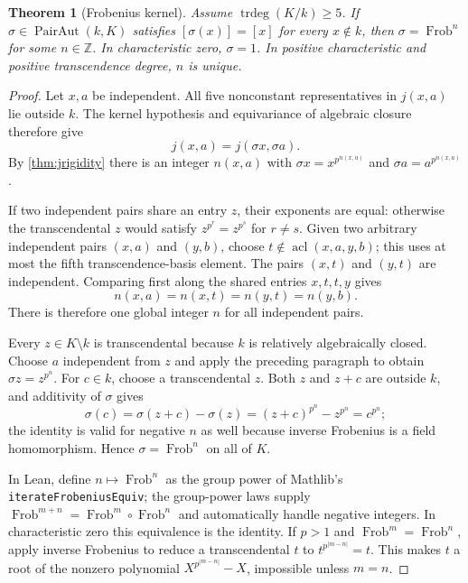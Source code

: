 \documentclass[11pt,oneside]{article}
\newtheorem{theorem}{Theorem}[section]
\theoremstyle{definition}
\theoremstyle{remark}
\newcommand{\acl}{\operatorname{acl}}
\newcommand{\trdeg}{\operatorname{trdeg}}
\newcommand{\Frob}{\operatorname{Frob}}
\newcommand{\lean}[1]{\nolinkurl{#1}}
\begin{document}
\begin{theorem}[Frobenius kernel]\label{thm:kernel}
Assume $\trdeg(K/k)\geq5$. If $\sigma\in\operatorname{PairAut}(k,K)$ satisfies
$[\sigma(x)]=[x]$ for every $x\notin k$, then
$\sigma=\Frob^n$ for some $n\in\mathbb Z$.  In characteristic zero, $\sigma=1$.
In positive characteristic and positive transcendence degree, $n$ is unique.
\end{theorem}
\begin{proof}
Let $x,a$ be independent.  All five nonconstant representatives in $j(x,a)$ lie outside
$k$.  The kernel hypothesis and equivariance of algebraic closure therefore give
\[
 j(x,a)=j(\sigma x,\sigma a).
\]
By \cref{thm:jrigidity} there is an integer $n(x,a)$ with
$\sigma x=x^{p^{n(x,a)}}$ and $\sigma a=a^{p^{n(x,a)}}$.

If two independent pairs share an entry $z$, their exponents are equal: otherwise the
transcendental $z$ would satisfy $z^{p^r}=z^{p^s}$ for $r\neq s$.  Given two arbitrary
independent pairs $(x,a)$ and $(y,b)$, choose
$t\notin\acl(x,a,y,b)$; this uses at most the fifth transcendence-basis element.  The
pairs $(x,t)$ and $(y,t)$ are independent.  Comparing first along the shared entries
$x,t,t,y$ gives
\[
 n(x,a)=n(x,t)=n(y,t)=n(y,b).
\]
There is therefore one global integer $n$ for all independent pairs.

Every $z\in K\setminus k$ is transcendental because $k$ is relatively algebraically
closed.  Choose $a$ independent from $z$ and apply the preceding paragraph to obtain
$\sigma z=z^{p^n}$.  For $c\in k$, choose a transcendental $z$.  Both $z$ and $z+c$ are
outside $k$, and additivity of $\sigma$ gives
\[
 \sigma(c)=\sigma(z+c)-\sigma(z)
 =(z+c)^{p^n}-z^{p^n}=c^{p^n};
\]
the identity is valid for negative $n$ as well because inverse Frobenius is a field
homomorphism.  Hence $\sigma=\Frob^n$ on all of $K$.

In Lean, define $n\mapsto\Frob^n$ as the group power of Mathlib's
\lean{iterateFrobeniusEquiv}; the group-power laws supply
$\Frob^{m+n}=\Frob^m\circ\Frob^n$ and automatically handle negative integers.  In
characteristic zero this equivalence is the identity.  If $p>1$ and
$\Frob^m=\Frob^n$, apply inverse Frobenius to reduce a transcendental $t$ to
$t^{p^{|m-n|}}=t$.  This makes $t$ a root of the nonzero polynomial
$X^{p^{|m-n|}}-X$, impossible unless $m=n$.
\end{proof}
\end{document}
